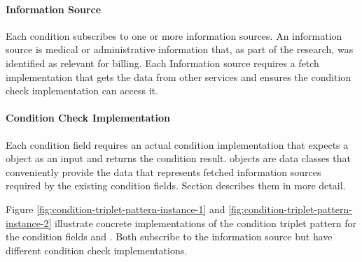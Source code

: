 \paragraph{Information Source}
Each condition subscribes to one or more information sources.
An information source is medical or administrative information that, as part of the research, was identified as relevant for billing.
Each Information source requires a fetch implementation that gets the data from other \AV services and ensures the condition check implementation can access it.

\paragraph{Condition Check Implementation}
Each condition field requires an actual condition implementation that expects a  object as an input and returns the condition result.
 objects are data classes that conveniently provide the data that represents fetched information sources required by the existing condition fields.
Section \addref describes them in more detail.

Figure \ref{fig:condition-triplet-pattern-instance-1} and \ref{fig:condition-triplet-pattern-instance-2} illustrate concrete implementations of the condition triplet pattern
for the condition fields  and .
Both subscribe to the  information source but have different condition check implementations.

